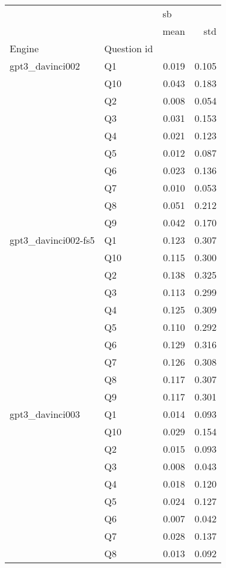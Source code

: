 \begin{tabular}{llrr}
\toprule
                &   & \multicolumn{2}{l}{sb} \\
                &   &  mean &   std \\
Engine & Question id &       &       \\
\midrule
gpt3\_davinci002 & Q1 & 0.019 & 0.105 \\
                & Q10 & 0.043 & 0.183 \\
                & Q2 & 0.008 & 0.054 \\
                & Q3 & 0.031 & 0.153 \\
                & Q4 & 0.021 & 0.123 \\
                & Q5 & 0.012 & 0.087 \\
                & Q6 & 0.023 & 0.136 \\
                & Q7 & 0.010 & 0.053 \\
                & Q8 & 0.051 & 0.212 \\
                & Q9 & 0.042 & 0.170 \\
gpt3\_davinci002-fs5 & Q1 & 0.123 & 0.307 \\
                & Q10 & 0.115 & 0.300 \\
                & Q2 & 0.138 & 0.325 \\
                & Q3 & 0.113 & 0.299 \\
                & Q4 & 0.125 & 0.309 \\
                & Q5 & 0.110 & 0.292 \\
                & Q6 & 0.129 & 0.316 \\
                & Q7 & 0.126 & 0.308 \\
                & Q8 & 0.117 & 0.307 \\
                & Q9 & 0.117 & 0.301 \\
gpt3\_davinci003 & Q1 & 0.014 & 0.093 \\
                & Q10 & 0.029 & 0.154 \\
                & Q2 & 0.015 & 0.093 \\
                & Q3 & 0.008 & 0.043 \\
                & Q4 & 0.018 & 0.120 \\
                & Q5 & 0.024 & 0.127 \\
                & Q6 & 0.007 & 0.042 \\
                & Q7 & 0.028 & 0.137 \\
                & Q8 & 0.013 & 0.092 \\

\end{tabular}
